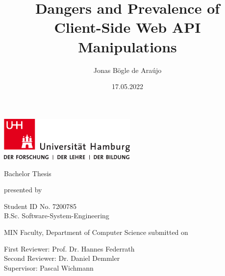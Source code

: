 \documentclass[
    fontsize=12pt,
    headings=small,
    parskip=half,           %
    bibliography=totoc,
    numbers=noenddot,       %
    open=any,               %
    final                   %
]{scrreprt}
\title{Dangers and Prevalence of\\ Client-Side Web API Manipulations}
\author{Jonas Bögle de Araújo}
\date{17.05.2022} %
\begin{document}
\begin{titlepage}


\includegraphics[width=6.8cm]{img/up-uhh-logo-u-2010-u-farbe-u-rgb.pdf}
\begin{center}\Large
    \vfill
    Bachelor Thesis
    \vfill
    \makeatletter
    {\Large\textsf{\textbf{\@title}}\par}
    \makeatother
    \vfill
    presented by
    \par\bigskip
    \makeatletter
    {\@author} \par
    \makeatother
    Student ID No. 7200785\\
    B.Sc. Software-System-Engineering \par
    MIN Faculty, Department of Computer Science
    \vfill
    \makeatletter
    submitted on {\@date}
    \makeatother
    \vfill

    First Reviewer: Prof. Dr. Hannes Federrath\\
    Second Reviewer: Dr. Daniel Demmler\\
    Supervisor: Pascal Wichmann
\end{center}
\end{titlepage}









\tableofcontents












\end{document}
